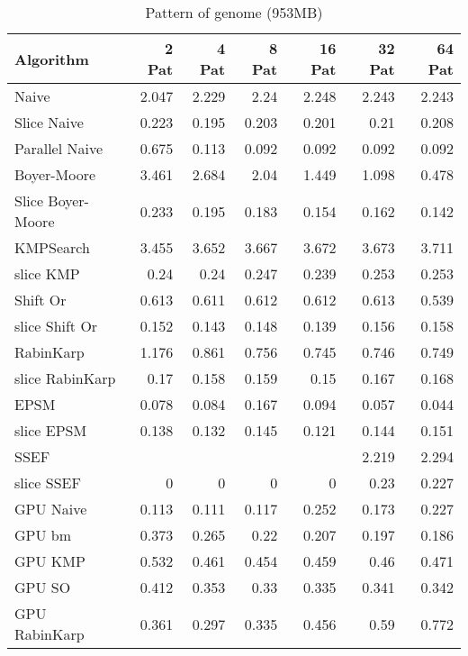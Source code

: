 \documentclass[11pt]{article}       %
\begin{document}
\begin{table}[htbp]
  \centering
  \caption{Pattern of genome (953MB)}
    \begin{tabular}{lrrrrrr}\label{t2}
Algorithm & 2 Pat & 4 Pat & 8 Pat & 16 Pat & 32 Pat & 64 Pat \\
 \hline
    Naive & 2.047 & 2.229 & 2.24  & 2.248 & 2.243 & 2.243 \\
    Slice Naive & 0.223 & 0.195 & 0.203 & 0.201 & 0.21  & 0.208 \\
    Parallel Naive & 0.675 & 0.113 & 0.092 & 0.092 & 0.092 & 0.092 \\
    {Boyer-Moore} & 3.461 & 2.684 & 2.04  & 1.449 & 1.098 & 0.478 \\
    Slice Boyer-Moore & 0.233 & 0.195 & 0.183 & 0.154 & 0.162 & 0.142 \\
    KMPSearch & 3.455 & 3.652 & 3.667 & 3.672 & 3.673 & 3.711 \\
    slice KMP & 0.24  & 0.24  & 0.247 & 0.239 & 0.253 & 0.253 \\
    Shift Or & 0.613 & 0.611 & 0.612 & 0.612 & 0.613 & 0.539 \\
    slice Shift Or & 0.152 & 0.143 & 0.148 & 0.139 & 0.156 & 0.158 \\
    RabinKarp & 1.176 & 0.861 & 0.756 & 0.745 & 0.746 & 0.749 \\
    slice RabinKarp & 0.17  & 0.158 & 0.159 & 0.15  & 0.167 & 0.168 \\
    EPSM  & 0.078 & 0.084 & 0.167 & 0.094 & 0.057 & 0.044 \\
    slice EPSM & 0.138 & 0.132 & 0.145 & 0.121 & 0.144 & 0.151 \\
    SSEF  &       &       &       &       & 2.219 & 2.294 \\
    slice SSEF & 0 & 0 & 0 & 0 & 0.23  & 0.227 \\
    GPU Naive & 0.113 & 0.111 & 0.117 & 0.252 & 0.173 & 0.227 \\
    GPU bm & 0.373 & 0.265 & 0.22  & 0.207 & 0.197 & 0.186 \\
    GPU KMP & 0.532 & 0.461 & 0.454 & 0.459 & 0.46  & 0.471 \\
    GPU SO & 0.412 & 0.353 & 0.33  & 0.335 & 0.341 & 0.342 \\
    GPU RabinKarp & 0.361 & 0.297 & 0.335 & 0.456 & 0.59  & 0.772 \\
    \end{tabular}%
  \label{tab:addlabel}%
\end{table}%
\end{document}
